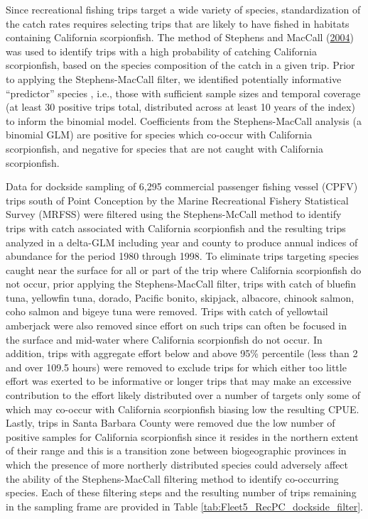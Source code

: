 \documentclass[12pt,]{article}
\begin{document}
Since recreational fishing trips target a wide variety of species,
standardization of the catch rates requires selecting trips that are
likely to have fished in habitats containing California scorpionfish.
The method of Stephens and MacCall
(\protect\hyperlink{ref-Stephens2004}{2004}) was used to identify trips
with a high probability of catching California scorpionfish, based on
the species composition of the catch in a given trip. Prior to applying
the Stephens-MacCall filter, we identified potentially informative
``predictor'' species , i.e., those with sufficient sample sizes and
temporal coverage (at least 30 positive trips total, distributed across
at least 10 years of the index) to inform the binomial model.
Coefficients from the Stephens-MacCall analysis (a binomial GLM) are
positive for species which co-occur with California scorpionfish, and
negative for species that are not caught with California scorpionfish.

Data for dockside sampling of 6,295 commercial passenger fishing vessel
(CPFV) trips south of Point Conception by the Marine Recreational
Fishery Statistical Survey (MRFSS) were filtered using the
Stephens-McCall method to identify trips with catch associated with
California scorpionfish and the resulting trips analyzed in a delta-GLM
including year and county to produce annual indices of abundance for the
period 1980 through 1998. To eliminate trips targeting species caught
near the surface for all or part of the trip where California
scorpionfish do not occur, prior applying the Stephens-MacCall filter,
trips with catch of bluefin tuna, yellowfin tuna, dorado, Pacific
bonito, skipjack, albacore, chinook salmon, coho salmon and bigeye tuna
were removed. Trips with catch of yellowtail amberjack were also removed
since effort on such trips can often be focused in the surface and
mid-water where California scorpionfish do not occur. In addition, trips
with aggregate effort below and above 95\% percentile (less than 2 and
over 109.5 hours) were removed to exclude trips for which either too
little effort was exerted to be informative or longer trips that may
make an excessive contribution to the effort likely distributed over a
number of targets only some of which may co-occur with California
scorpionfish biasing low the resulting CPUE. Lastly, trips in Santa
Barbara County were removed due the low number of positive samples for
California scorpionfish since it resides in the northern extent of their
range and this is a transition zone between biogeographic provinces in
which the presence of more northerly distributed species could adversely
affect the ability of the Stephens-MacCall filtering method to identify
co-occurring species. Each of these filtering steps and the resulting
number of trips remaining in the sampling frame are provided in Table
\ref{tab:Fleet5_RecPC_dockside_filter}.
\end{document}
